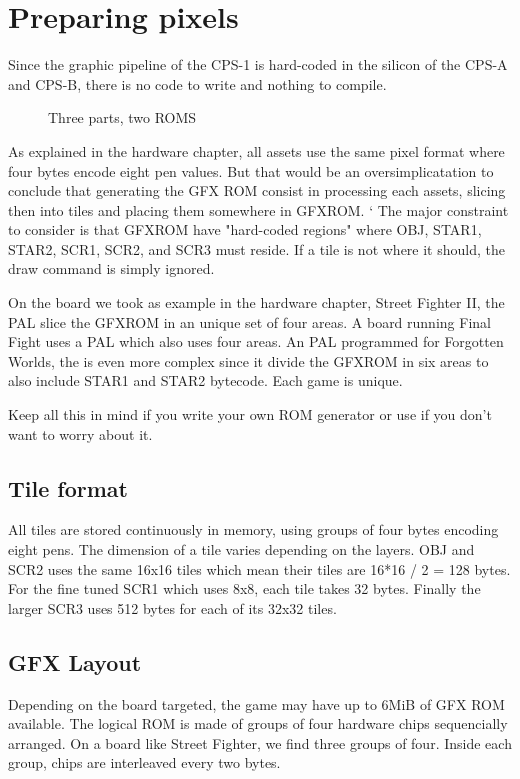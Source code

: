 \chapter{Preparing pixels}
Since the graphic pipeline of the CPS-1 is hard-coded in the silicon of the CPS-A and CPS-B, there is no code to write and nothing to compile. 

\begin{figure}[H]
\caption*{Three parts, two ROMS}
\end{figure}

As explained in the hardware chapter, all assets use the same pixel format where four bytes encode eight pen values. But that would be an oversimplicatation to conclude that generating the GFX ROM consist in processing each assets, slicing then into tiles and placing them somewhere in GFXROM.
`
The major constraint to consider is that GFXROM have "hard-coded regions" where OBJ, STAR1, STAR2, SCR1, SCR2, and SCR3 must reside. If a tile is not where it should, the draw command is simply ignored.

On the board we took as example in the hardware chapter, Street Fighter II, the  PAL slice the GFXROM in an unique set of four areas. A board running Final Fight uses a  PAL which also uses four areas. An PAL programmed for Forgotten Worlds, the  is even more complex since it divide the GFXROM in six areas to also include STAR1 and STAR2 bytecode. Each game is unique. 

Keep all this in mind if you write your own ROM generator or use  if you don't want to worry about it.

\section{Tile format}
All tiles are stored continuously in memory, using groups of four bytes encoding eight pens. The dimension of a tile varies depending on the layers. OBJ and SCR2 uses the same 16x16 tiles which mean their tiles are 16*16 / 2 = 128 bytes. For the fine tuned SCR1 which uses 8x8, each tile takes 32 bytes. Finally the larger SCR3 uses 512 bytes for each of its 32x32 tiles.

\section{GFX Layout}
Depending on the board targeted, the game may have up to 6MiB of GFX ROM available. The logical ROM is made of groups of four hardware chips sequencially arranged. On a board like Street Fighter, we find three groups of four. Inside each group, chips are interleaved every two bytes.

